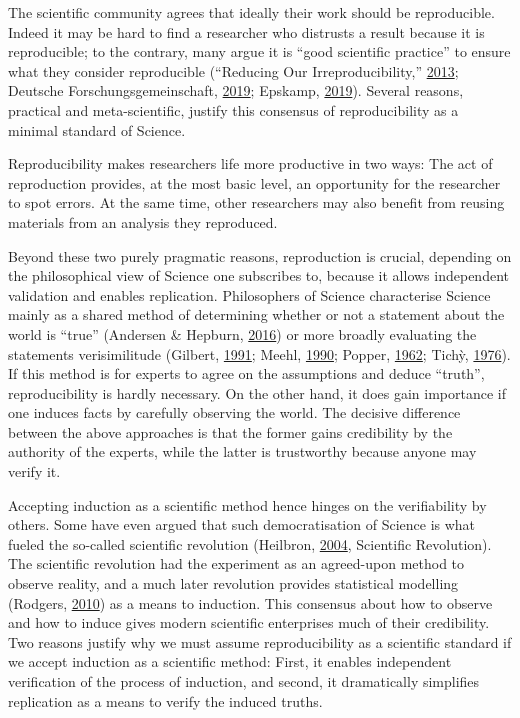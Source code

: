 \documentclass[12pt,a4paper,]{article}
\begin{document}
The scientific community agrees that ideally their work should be reproducible.
Indeed it may be hard to find a researcher who distrusts a result because it is reproducible; to the contrary, many argue it is ``good scientific practice'' to ensure what they consider reproducible (``Reducing Our Irreproducibility,'' \protect\hyperlink{ref-AnnouncementReducingOur2013}{2013}; Deutsche Forschungsgemeinschaft, \protect\hyperlink{ref-dfg2019}{2019}; Epskamp, \protect\hyperlink{ref-epskamp2019rep}{2019}).
Several reasons, practical and meta-scientific, justify this consensus of reproducibility as a minimal standard of Science.

Reproducibility makes researchers life more productive in two ways:
The act of reproduction provides, at the most basic level, an opportunity for the researcher to spot errors. At the same time, other researchers may also benefit from reusing materials from an analysis they reproduced.

Beyond these two purely pragmatic reasons, reproduction is crucial, depending on the philosophical view of Science one subscribes to, because it allows independent validation and enables replication.
Philosophers of Science characterise Science mainly as a shared method of determining whether or not a statement about the world is ``true'' (Andersen \& Hepburn, \protect\hyperlink{ref-andersonScientificMethod2016}{2016}) or more broadly evaluating the statements verisimilitude (Gilbert, \protect\hyperlink{ref-gilbertModelBuildingDefinition1991}{1991}; Meehl, \protect\hyperlink{ref-meehlAppraisingAmendingTheories1990}{1990}; Popper, \protect\hyperlink{ref-popperCommentsTruthGrowth1962}{1962}; Tichỳ, \protect\hyperlink{ref-tichyVerisimilitudeRedefined1976}{1976}).
If this method is for experts to agree on the assumptions and deduce ``truth'', reproducibility is hardly necessary.
On the other hand, it does gain importance if one induces facts by carefully observing the world.
The decisive difference between the above approaches is that the former gains credibility by the authority of the experts, while the latter is trustworthy because anyone may verify it.

Accepting induction as a scientific method hence hinges on the verifiability by others.
Some have even argued that such democratisation of Science is what fueled the so-called scientific revolution (Heilbron, \protect\hyperlink{ref-heilbronOxfordCompanionHistory2004}{2004}, Scientific Revolution).
The scientific revolution had the experiment as an agreed-upon method to observe reality, and a much later revolution provides statistical modelling (Rodgers, \protect\hyperlink{ref-rodgersEpistemologyMathematicalStatistical2010}{2010}) as a means to induction.
This consensus about how to observe and how to induce gives modern scientific enterprises much of their credibility.
Two reasons justify why we must assume reproducibility as a scientific standard if we accept induction as a scientific method:
First, it enables independent verification of the process of induction, and second, it dramatically simplifies replication as a means to verify the induced truths.
\end{document}
